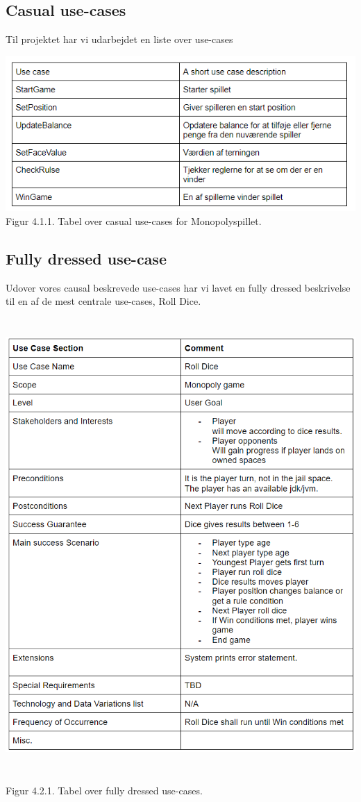 \begin{flushleft}
\subsection{Casual use-cases}
\doublespacing


Til projektet har vi udarbejdet en liste over use-cases

\includegraphics[width=1\textwidth]{Report/figures/Use case.PNG}
Figur 4.1.1. Tabel over casual use-cases for Monopolyspillet.
\newpage
\subsection{Fully dressed use-case}
Udover vores causal beskrevede use-cases har vi lavet en fully dressed beskrivelse til en af de mest centrale use-cases, Roll Dice.
\includegraphics[width=1\textwidth, height = 18cm]{Report/figures/Fullyusecase.png}\\[0cm]
Figur 4.2.1. Tabel over fully dressed use-cases.


\end{flushleft}
